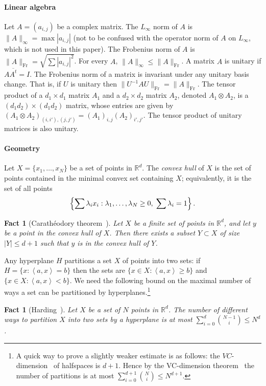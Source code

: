 \documentclass[10pt]{article}
\newtheorem{fact}[theorem]{Fact}
\theoremstyle{definition}
\numberwithin{equation}{section}
\newcommand{\R}{{\mathbb R}}
\def\R{\mathbb{R}}
\newcommand{\ip}[1]{\left<#1\right>}
\def\Fr{\textrm{Fr}}
\begin{document}
\paragraph{Linear algebra}
Let $A=(a_{i,j})$ be a complex matrix. The $L_{\infty}$ norm of $A$ is $\|A\|_{\infty}=\max
|a_{i,j}|$ (not to be confused with the operator norm of $A$ on $L_{\infty}$, which is not used in this paper).
The Frobenius norm of $A$ is $\|A\|_{\Fr} = \sqrt{\sum
|a_{i,j}|^2}$. For every $A$, $\|A\|_{\infty} \le \|A\|_{\Fr}$. A matrix
$A$ is unitary if $A \overline{A^t} = I$. The Frobenius
norm of a matrix is invariant under any unitary
basis change. That is, if $U$
is unitary then $\|U^{-1} A U\|_{\Fr} = \|A\|_{\Fr}$. The tensor product
of a $d_1 \times d_1$ matrix $A_1$ and a $d_2 \times d_2$ matrix $A_2$,
denoted $A_1 \otimes A_2$, is a $(d_1 d_2) \times (d_1 d_2)$ matrix, whose
entries are given by $(A_1 \otimes A_2)_{(i,i'),(j,j')} = (A_1)_{i,j}
(A_2)_{i',j'}$. The tensor product of unitary matrices is
also unitary.

\paragraph{Geometry}
Let $X=\{x_1,\ldots,x_N\}$ be a set of points in $\R^d$. The \emph{convex hull} of $X$ is the set of points contained in the minimal convex
set containing $X$; equivalently, it is the set of all points 
\[
\Bigl\{\sum
\lambda_i x_i: \lambda_1,\ldots,\lambda_N \ge 0, \;\sum \lambda_i=1\Bigr\}\,.\]

\begin{fact}[Carath\'{e}odory theorem~\cite{Caratheodory}]\label{fact:caratheodory}
Let $X$ be a finite set of points in $\R^d$, and let $y$ be a point
in the convex hull of $X$. Then there exists a subset $Y \subset X$
of size $|Y| \le d+1$ such that $y$ is in the convex hull of $Y$.
\end{fact}

Any hyperplane $H$ partitions a set $X$ of points into two sets: if
$H=\{x:\ip{a,x}=b\}$ then the sets are $\{x \in X:\ip{a,x} \ge b\}$
and $\{x \in X:\ip{a,x}<b\}$. We need the following bound on the maximal
number of ways
a set can be partitioned by hyperplanes.\footnote{A quick way to prove a slightly weaker estimate
is as follows: the $VC$-dimension~\cite{VC71} of
halfspaces is $d+1$. Hence by the VC-dimension
theorem~\cite{VC71,Sauer72,Shelah72} the number of partitions
is at most $\sum_{i=0}^{d+1} {N \choose i} \le N^{d+1}$.}
\begin{fact}[Harding~\cite{Harding67}]
\label{fact:partition_hyperplane}
Let $X$ be a set of $N$ points in $\R^d$. The number
of different ways to partition $X$ into two sets by a hyperplane is
at most $\sum_{i=0}^d {{N-1} \choose i}  \leq N^{d}$.
\end{fact}
\end{document}
